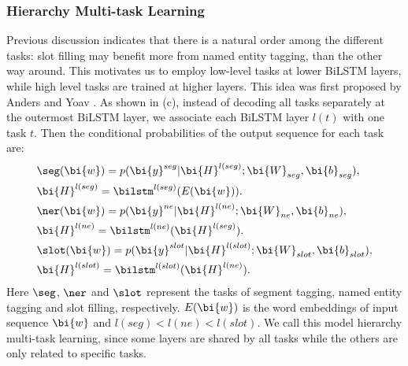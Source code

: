 \subsubsection{Hierarchy Multi-task Learning}
Previous discussion indicates that 
there is a natural order among the different tasks:
slot filling may benefit more from named entity tagging, than the other way around.
This motivates us to employ low-level tasks at lower BiLSTM layers,
while high level tasks are trained at higher layers.
This idea was first proposed by Anders and Yoav \cite{sogaard2016deep}.
As shown in (c), 
instead of decoding all tasks separately at the outermost BiLSTM layer, 
we associate each BiLSTM layer
$l(t)$ with one task $t$.
Then the conditional probabilities of the output sequence for each task are:
\begin{eqnarray*}
	& \seg(\bi{w})=p(\bi{y}^{seg}|\bi{H}^{l(seg)};\bi{W}_{seg},\bi{b}_{seg}), \\
	& \bi{H}^{l(seg)}=\bilstm^{l(seg)}(E(\bi{w})). \\
	& \ner(\bi{w})=p(\bi{y}^{ne}|\bi{H}^{l(ne)};\bi{W}_{ne},\bi{b}_{ne}), \\
	& \bi{H}^{l(ne)}=\bilstm^{l(ne)}(\bi{H}^{l(seg)}).\\
	& \slot(\bi{w})=p(\bi{y}^{slot}|\bi{H}^{l(slot)};\bi{W}_{slot},\bi{b}_{slot}), \\
	& \bi{H}^{l(slot)}=\bilstm^{l(slot)}(\bi{H}^{l(ne)}).
\end{eqnarray*}
Here $\seg$, $\ner$ and $\slot$ represent the tasks of
segment tagging, named entity tagging and slot filling, respectively.
$E(\bi{w})$ is the word embeddings of input sequence $\bi{w}$ and 
$l(seg) < l(ne) < l(slot)$.
We call this model hierarchy multi-task learning,
since some layers are shared by all tasks 
while the others are only related to specific tasks.

